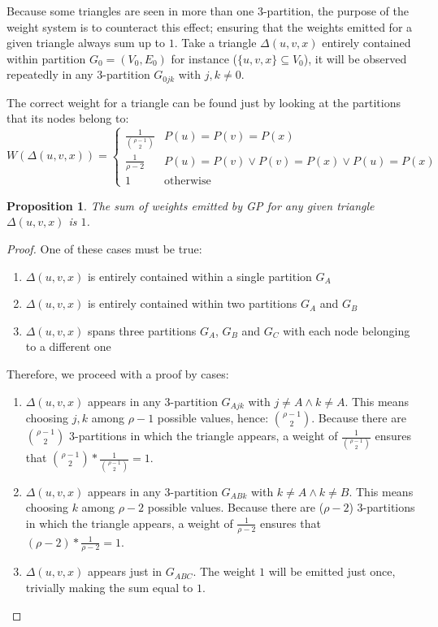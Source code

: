 \documentclass[paper=a4, fontsize=11pt]{scrartcl}
\newtheorem{proposition}{Proposition}
\numberwithin{equation}{section}
\numberwithin{figure}{section}
\numberwithin{table}{section}
\begin{document}
Because some triangles are seen in more than one 3-partition, the purpose of
the weight system is to counteract this effect; ensuring that the weights
emitted for a given triangle always sum up to $1$. Take a triangle $\Delta(u, v,
x)$ entirely contained within partition $G_0=(V_0, E_0)$ for instance
($\{u,v,x\} \subseteq V_0$), it will be observed repeatedly in any 3-partition
$G_{0jk}$ with $j,k\neq 0$.

The correct weight for a triangle can be found just by looking at the partitions
that its nodes belong to:
\[
    W(\Delta(u,v,x)) = \begin{cases}
        \frac{1}{\binom{\rho-1}{2}} & P(u) = P(v) = P(x)  \\
        \frac{1}{\rho-2} & P(u) = P(v) \vee P(v) = P(x) \vee P(u) = P(x) \\
        1 & \text{otherwise}
    \end{cases}
\]

\begin{proposition}
    The sum of weights emitted by GP for any given triangle $\Delta(u, v, x)$ is $1$.
\end{proposition}
\begin{proof}
    One of these cases must be true:
    \begin{enumerate}
        \item $\Delta(u, v, x)$ is entirely contained within a single partition $G_A$
        \item $\Delta(u, v, x)$ is entirely contained within two partitions $G_A$ and $G_B$
        \item $\Delta(u, v, x)$ spans three partitions $G_A$, $G_B$ and $G_C$
        with each node belonging to a different one
    \end{enumerate}
    Therefore, we proceed with a proof by cases:
    \begin{enumerate}
        \item $\Delta(u, v, x)$ appears in any 3-partition $G_{Ajk}$
        with $j\neq A \wedge k\neq A$. This means
        choosing $j,k$ among $\rho-1$ possible values, hence:
        $\binom{\rho-1}{2}$. Because there are $\binom{\rho-1}{2}$ 3-partitions
        in which the triangle appears, a weight of $\frac{1}{\binom{\rho-1}{2}}$
        ensures that $\binom{\rho-1}{2}* \frac{1}{\binom{\rho-1}{2}} = 1$.
        \item $\Delta(u, v, x)$ appears in any 3-partition $G_{ABk}$ with $k
        \neq A \wedge k \neq B$. This means choosing $k$ among $\rho-2$ possible
        values. Because there are ($\rho-2$) 3-partitions in which the triangle
        appears, a weight of $\frac{1}{\rho-2}$ ensures that
        $(\rho-2)*\frac{1}{\rho-2}=1$.
        \item $\Delta(u, v, x)$ appears just in $G_{ABC}$. The weight $1$ will
        be emitted just once, trivially making the sum equal to $1$.
    \end{enumerate}
\end{proof}
\end{document}
